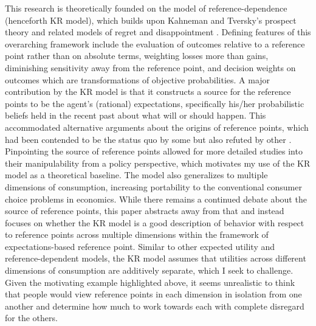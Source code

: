 \documentclass[12pt, letterpaper]{article}
\begin{document}
This research is theoretically founded on the \textcite{koszegi.2006.modelreferencedependenta} model of reference-dependence (henceforth KR model), which builds upon Kahneman and Tversky's \parencite*{kahneman.1979.prospecttheory,tversky.1991.lossaversion} prospect theory and related models of regret and disappointment \parencite[e.g.][]{bell.1982.regretdecision,bell.1985.disappointmentdecision,loomes.1982.regrettheory,loomes.1986.disappointmentdynamic,gul.1991.theorydisappointment}. Defining features of this overarching framework include the evaluation of outcomes relative to a reference point rather than on absolute terms, weighting losses more than gains, diminishing sensitivity away from the reference point, and decision weights on outcomes which are transformations of objective probabilities. A major contribution by the KR model is that it constructs a source for the reference points to be the agent's (rational) expectations, specifically his/her probabilistic beliefs held in the recent past about what will or should happen. This accommodated alternative arguments about the origins of reference points, which had been contended to be the status quo by some \parencite[e.g.][]{genesove.2001.lossaversion,kahneman.1990.experimentaltests} but also refuted by other \parencite[e.g.][]{plott.2005.willingnesspay,tversky.1991.lossaversion}. Pinpointing the source of reference points allowed for more detailed studies into their manipulability from a policy perspective, which motivates my use of the KR model as a theoretical baseline. The model also generalizes to multiple dimensions of consumption, increasing portability to the conventional consumer choice problems in economics. While there remains a continued debate about the source of reference points, this paper abstracts away from that and instead focuses on whether the KR model is a good description of behavior with respect to reference points across multiple dimensions within the framework of expectations-based reference point. Similar to other expected utility and reference-dependent models, the KR model assumes that utilities across different dimensions of consumption are additively separate, which I seek to challenge. Given the motivating example highlighted above, it seems unrealistic to think that people would view reference points in each dimension in isolation from one another and determine how much to work towards each with complete disregard for the others.
\end{document}
